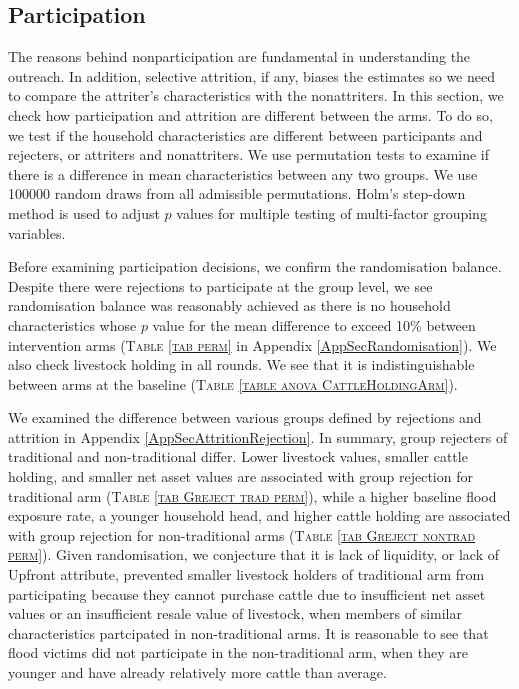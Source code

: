 \subsection{Participation}
\label{ResultsSectionParticipation}

	The reasons behind nonparticipation are fundamental in understanding the outreach. In addition, selective attrition, if any, biases the estimates so we need to compare the attriter's characteristics with the nonattriters. In this section, we check how participation and attrition are different between the arms. To do so, we test if the household characteristics are different between participants and rejecters, or attriters and nonattriters. We use permutation tests to examine if there is a difference in mean characteristics between any two groups. We use 100000 random draws from all admissible permutations. Holm's step-down method is used to adjust $p$ values for multiple testing of multi-factor grouping variables.

	Before examining participation decisions, we confirm the randomisation balance. Despite there were rejections to participate at the group level, we see randomisation balance was reasonably achieved as there is no household characteristics whose $p$ value for the mean difference to exceed 10\% between intervention arms (\textsc{\normalsize Table \ref{tab perm}} in Appendix \ref{AppSecRandomisation}). We also check livestock holding in all rounds. We see that it is indistinguishable between arms at the baseline (\textsc{Table \ref{table anova CattleHoldingArm}}).

	We examined the difference between various groups defined by rejections and attrition in Appendix \ref{AppSecAttritionRejection}. In summary, group rejecters of \textsf{traditional} and non-\textsf{traditional} differ. Lower livestock values, smaller cattle holding, and smaller net asset values are associated with group rejection for \textsf{traditional} arm (\textsc{\normalsize Table \ref{tab Greject trad perm}}), while a higher baseline flood exposure rate, a younger household head, and higher cattle holding are associated with group rejection for non-\textsf{traditional} arms (\textsc{\normalsize Table \ref{tab Greject nontrad perm}}). Given randomisation, we conjecture that it is lack of liquidity, or lack of \textsf{Upfront} attribute, prevented smaller livestock holders of \textsf{traditional} arm from participating because they cannot purchase cattle due to insufficient net asset values or an insufficient resale value of livestock, when members of similar characteristics partcipated in non-\textsf{traditional} arms. %
	It is reasonable to see that flood victims did not participate in the non-\textsf{traditional} arm, when they are younger and have already relatively more cattle than average. 

